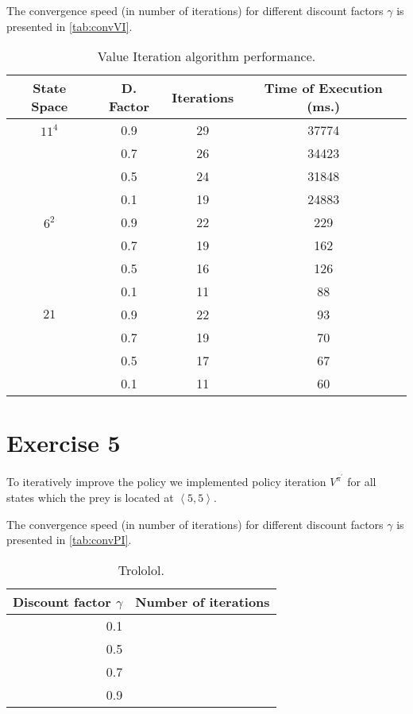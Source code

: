 \documentclass[a4paper,11pt]{article}
\begin{document}
The convergence speed (in number of iterations) for different discount factors $\gamma$ is presented in \autoref{tab:convVI}.
\begin{table}[h!]
\caption{Value Iteration algorithm performance.}
\label{viap}
\begin{center}
\begin{tabular}{c@{ }@{ }c@{ }@{ }c@{ }@{ }c}
\textbf{State Space} & \textbf{D. Factor} & \textbf{Iterations} & \textbf{Time of Execution (ms.)} \\
\midrule
$11^{4}$ 		& 0.9 				& 29 				& 37774 \\
				& 0.7 				& 26 				& 34423 	 \\
 				& 0.5 				& 24 				& 31848 	 \\
 				& 0.1 				& 19 				& 24883  \\
$6^{2}$			& 0.9 				& 22 				& 229 	 \\
				& 0.7 				& 19 				& 162  \\
				& 0.5 				& 16 				& 126 	 \\
				& 0.1 				& 11 				& 88 	 \\
$21$ 			& 0.9 				& 22 				& 93  \\
	 			& 0.7 				& 19 				& 70  \\
	 			& 0.5 				& 17 				& 67  \\
	 			& 0.1 				& 11 				& 60  \\
\end{tabular}
\end{center}
\end{table}

\section*{Exercise 5}
To iteratively improve the policy we implemented policy iteration $V^{\pi^\prime}$ for all states which the prey is located at $\left<5,5\right>$.

The convergence speed (in number of iterations) for different discount factors $\gamma$ is presented in \autoref{tab:convPI}.
\begin{table}
\caption{Trololol.}
\label{tab:convPI}
\begin{center}
\begin{tabular}{|@{ }r@{ }|@{ }r@{ }|}
\hline
Discount factor $\gamma$ & Number of iterations \\
\hline
0.1 & \\
0.5 & \\
0.7 & \\
0.9 & \\
\hline
\end{tabular}
\end{center}
\end{table}
\end{document}
